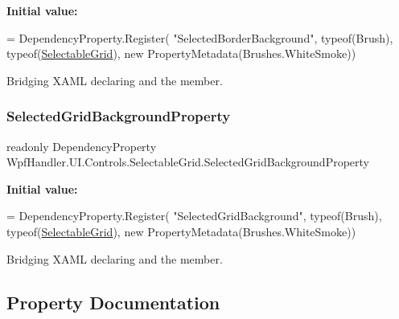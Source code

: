 {\bfseries Initial value\+:}
\begin{DoxyCode}
= DependencyProperty.Register(
            \textcolor{stringliteral}{"SelectedBorderBackground"}, typeof(Brush), typeof(\mbox{\hyperlink{class_wpf_handler_1_1_u_i_1_1_controls_1_1_selectable_grid_a3968411e99848235dfb6bdb7ec0f8fc5}{SelectableGrid}}), \textcolor{keyword}{new} 
      PropertyMetadata(Brushes.WhiteSmoke))
\end{DoxyCode}


Bridging X\+A\+ML declaring and the member. 

\mbox{\label{class_wpf_handler_1_1_u_i_1_1_controls_1_1_selectable_grid_abc4ecb5aed8ec5cacf5e539bacb89560}} 
\subsubsection{\texorpdfstring{Selected\+Grid\+Background\+Property}{SelectedGridBackgroundProperty}}
{\footnotesize\ttfamily readonly Dependency\+Property Wpf\+Handler.\+U\+I.\+Controls.\+Selectable\+Grid.\+Selected\+Grid\+Background\+Property\hspace{0.3cm}{\ttfamily [static]}}

{\bfseries Initial value\+:}
\begin{DoxyCode}
= DependencyProperty.Register(
            \textcolor{stringliteral}{"SelectedGridBackground"}, typeof(Brush), typeof(\mbox{\hyperlink{class_wpf_handler_1_1_u_i_1_1_controls_1_1_selectable_grid_a3968411e99848235dfb6bdb7ec0f8fc5}{SelectableGrid}}), \textcolor{keyword}{new} 
      PropertyMetadata(Brushes.WhiteSmoke))
\end{DoxyCode}


Bridging X\+A\+ML declaring and the member. 



\subsection{Property Documentation}
\mbox{\label{class_wpf_handler_1_1_u_i_1_1_controls_1_1_selectable_grid_ae199a4309937de8ff5ba0e5810c46c60}} 
